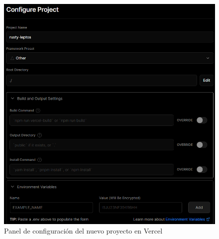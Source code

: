 \begin{figure}
    \centering
    \includegraphics[scale=0.8]{images/vercelConfig.png}
    \caption{Panel de configuración del nuevo proyecto en Vercel}
    \label{fig:vercelConfig}
\end{figure}
